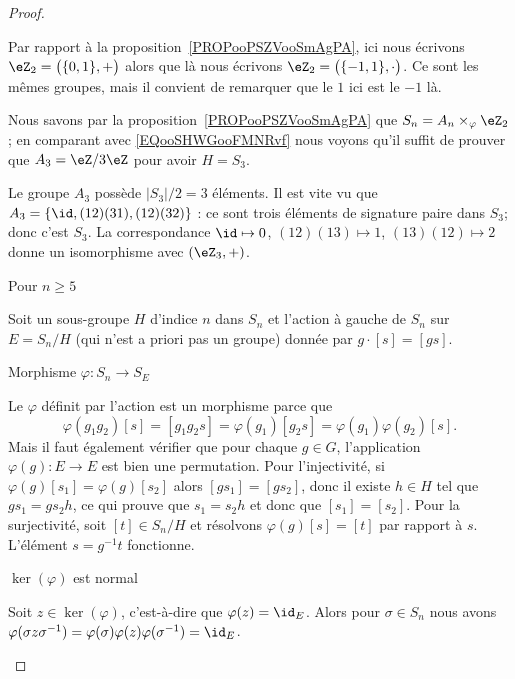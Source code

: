 \begin{proof}
\begin{subproof}
            Par rapport à la proposition~\ref{PROPooPSZVooSmAgPA}, ici nous écrivons \( \eZ_2=\big( \{ 0,1 \},+ \big)\) alors que là nous écrivons \( \eZ_2=\big( \{ -1,1 \},\cdot \big)\). Ce sont les mêmes groupes, mais il convient de remarquer que le \( 1\) ici est le \( -1\) là.

            Nous savons par la proposition~\ref{PROPooPSZVooSmAgPA} que \( S_n=A_n\times_{\varphi}\eZ_2\); en comparant avec \eqref{EQooSHWGooFMNRvf} nous voyons qu'il suffit de prouver que \( A_3=\eZ/3\eZ\) pour avoir \( H=S_3\).

            Le groupe \( A_3\) possède \( | S_3 |/2=3\) éléments. Il est vite vu que \( A_3=\{ \id,(12)(31), (12)(32) \}\) : ce sont trois éléments de signature paire dans \( S_3\); donc c'est \( S_3\). La correspondance \( \id\mapsto 0\), \( (12)(13)\mapsto 1\), \( (13)(12)\mapsto 2\) donne un isomorphisme avec \( (\eZ_3,+)\).

        \item[Pour \( n\geq 5\)]

            Soit un sous-groupe \( H\) d'indice \( n\) dans \( S_n\) et l'action à gauche de \( S_n\) sur \( E=S_n/H\) (qui n'est a priori pas un groupe) donnée par \( g\cdot [s]=[gs]\).

            \begin{subproof}
                \item[Morphisme \( \varphi\colon S_n\to S_E\)]

                    Le \( \varphi\) définit par l'action est un morphisme parce que
                    \begin{equation}
                        \varphi(g_1g_2)[s]=[g_1g_2s]=\varphi(g_1)[g_2s]=\varphi(g_1)\varphi(g_2)[s].
                    \end{equation}
                    Mais il faut également vérifier que pour chaque \( g\in G\), l'application \( \varphi(g)\colon E\to E\) est bien une permutation. Pour l'injectivité, si \( \varphi(g)[s_1]=\varphi(g)[s_2]\) alors \( [gs_1]=[gs_2]\), donc il existe \( h\in H\) tel que \( gs_1=gs_2h\), ce qui prouve que \( s_1=s_2h\) et donc que \( [s_1]=[s_2]\). Pour la surjectivité, soit \( [t]\in S_n/H\) et résolvons \( \varphi(g)[s]=[t]\) par rapport à \( s\). L'élément \( s=g^{-1} t\) fonctionne.

                \item[\( \ker(\varphi)\) est normal]

                    Soit \( z\in\ker(\varphi)\), c'est-à-dire que \( \varphi(z)=\id_E\). Alors pour \( \sigma\in S_n\) nous avons \( \varphi(\sigma z\sigma^{-1})=\varphi(\sigma)\varphi(z)\varphi(\sigma^{-1})=\id_E\).


\end{subproof}
\end{subproof}
\end{proof}
